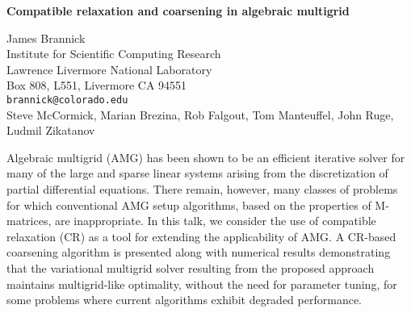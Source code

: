 \documentclass{report}
\begin{document}

\begin{center}
{\large
{\bf Compatible relaxation and coarsening in algebraic multigrid}}

	James Brannick \\
	Institute for Scientific Computing Research \\
	Lawrence Livermore National Laboratory \\
	Box 808, L551, Livermore CA 94551 \\
	{\tt brannick@colorado.edu} \\
	Steve McCormick, Marian Brezina,
	Rob Falgout, Tom Manteuffel, John Ruge, Ludmil Zikatanov
\end{center}
Algebraic multigrid (AMG) has been shown to be an efficient
iterative solver for many of the large and sparse linear
systems arising from the discretization of partial
differential equations. There remain, however, many classes
of problems for which conventional AMG setup algorithms,
based on the properties of M-matrices, are inappropriate. In
this talk, we consider the use of compatible relaxation (CR)
as a tool for extending the applicability of AMG. A CR-based
coarsening algorithm is presented along with numerical
results demonstrating that the variational multigrid solver
resulting from the proposed approach maintains
multigrid-like optimality, without the need for parameter
tuning, for some problems where current algorithms exhibit
degraded performance.



\end{document}
